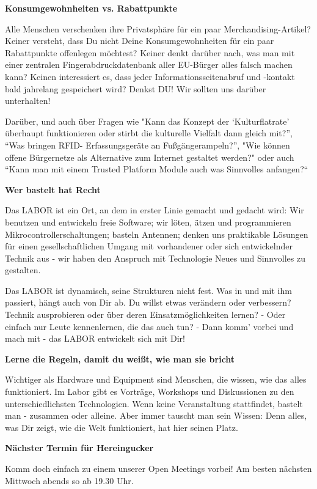 


{\bf Konsumgewohnheiten vs. Rabattpunkte}\par
Alle Menschen verschenken ihre Privatsph\"are f\"ur ein paar Merchandising-Artikel? Keiner versteht, dass Du nicht Deine Konsumgewohnheiten f\"ur ein paar Rabattpunkte offenlegen m\"ochtest? Keiner denkt dar\"uber nach, was man mit einer zentralen Fingerabdruckdatenbank aller EU-B\"urger alles falsch machen kann? Keinen interessiert es, dass jeder Informationsseitenabruf und -kontakt bald jahrelang gespeichert wird? Denkst DU! Wir sollten uns dar\"uber unterhalten!\par
Dar\"uber, und auch \"uber Fragen wie "Kann das Konzept der ‘Kulturﬂatrate’ \"uberhaupt funktionieren oder stirbt die kulturelle Vielfalt dann gleich mit?”, “Was bringen RFID- Erfassungsger\"ate an Fußg\"angerampeln?”, "Wie k\"onnen offene B\"urgernetze als Alternative zum Internet gestaltet werden?" oder auch “Kann man mit einem Trusted Platform Module auch was Sinnvolles anfangen?“\par
\vskip1cm


{\bf Wer bastelt hat Recht}\par
Das LABOR ist ein Ort, an dem in erster Linie gemacht und gedacht wird: Wir benutzen und entwickeln freie Software; wir l\"oten, \"atzen und programmieren Mikrocontrollerschaltungen; basteln Antennen; denken uns praktikable L\"osungen f\"ur einen gesellschaftlichen Umgang mit vorhandener oder sich entwickelnder Technik aus - wir haben den Anspruch mit Technologie Neues und Sinnvolles zu gestalten.\par
Das LABOR ist dynamisch, seine Strukturen nicht fest. Was in und mit ihm passiert, h\"angt auch von Dir ab. Du willst etwas ver\"andern oder verbessern? Technik ausprobieren oder \"uber deren Einsatzm\"oglichkeiten lernen? - Oder einfach nur Leute kennenlernen, die das auch tun? - Dann komm' vorbei und mach mit - das LABOR entwickelt sich mit Dir!\par
{\bf Lerne die Regeln, damit du weißt, wie man sie bricht}\par
Wichtiger als Hardware und Equipment sind Menschen, die wissen, wie das alles funktioniert. Im Labor gibt es Vortr\"age, Workshops und Diskussionen zu den unterschiedlichsten Technologien. Wenn keine Veranstaltung stattﬁndet, bastelt man - zusammen oder alleine. Aber immer tauscht man sein Wissen: Denn alles, was Dir zeigt, wie die Welt funktioniert, hat hier seinen Platz.\par
\vskip1cm
{\bf N\"achster Termin f\"ur Hereingucker}\par
Komm doch einfach zu einem unserer Open Meetings vorbei! Am besten n\"achsten Mittwoch abends so ab 19.30 Uhr.\par
\vskip1cm


